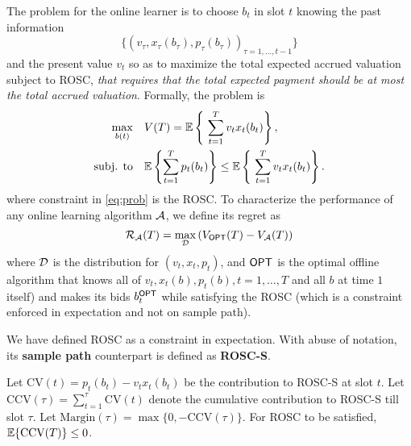 The problem for the online learner is to choose $b_t$ in slot $t$ knowing the past information $$\{(v_\tau, x_\tau(b_\tau), p_\tau(b_\tau))_{\tau=1, \dots, t-1}\}$$ and the present value $ v_t$ so as to maximize the total expected accrued valuation subject to ROSC, {\it that requires that the 
total expected payment should be at most the total accrued valuation}. Formally, the problem is 
\begin{align}\nonumber
\max_{b(t)} & \quad V(T)=  {\mathbb{E}}\left\{\ \sum_{t=1}^T v_t x_t(b_t)\right\},\\\label{eq:prob}
\text{subj. to} &  \quad {\mathbb{E}}\left\{\sum_{t=1}^Tp_t(b_t)\right\} \le   {\mathbb{E}}\left\{\ \sum_{t=1}^T v_t x_t(b_t)\right\}.
\end{align}
where constraint in \eqref{eq:prob} is the ROSC.
To characterize the performance of any online learning algorithm $\mathcal{A}$, we define its  regret as 
\begin{equation}\label{defn:regret}
\cR_\cA(T) = \max_{\cD} \left(V_{\opt}(T) - V_{\cA}(T)\right) %
\end{equation}
where $\mathcal{D}$ is the distribution for $(v_t,x_t,p_t)$, and  $\mathsf{OPT}$ is the optimal offline algorithm that knows all of $v_t, x_t(b), p_t(b), t=1,\dots, T$ and all $b$ at time $1$ itself) and makes its bids $b^{\mathsf{OPT}}_t$ while satisfying the ROSC (which is a constraint enforced in expectation and not on sample path).

We have defined ROSC as a constraint in expectation. With abuse of notation, its {\bf sample path} counterpart is defined as {\bf ROSC-S}.
\begin{definition}\label{defn:ccv}
Let $\text{CV}(t ) = p_t(b_t) - v_t x_t(b_t)$ be the contribution to ROSC-S  at slot $t$.
Let $\text{CCV}(\tau) = \sum_{t=1}^\tau \text{CV}(t)$ denote the cumulative contribution to ROSC-S till slot $\tau$. 
Let $\text{Margin}(\tau) = \max\{0, - \text{CCV}(\tau)\}$. For ROSC to be satisfied, ${\mathbb{E}}\{\text{CCV}(T)\}\le 0$.
\end{definition}
